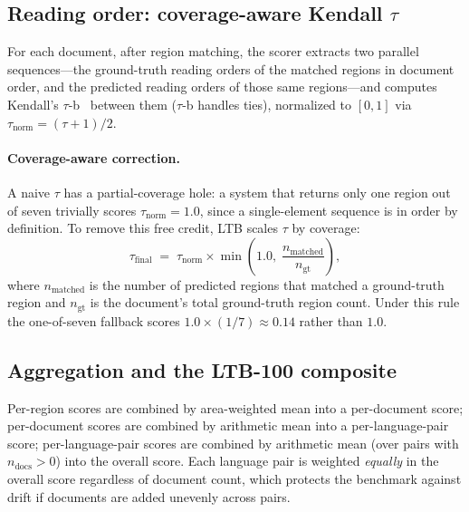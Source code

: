 \documentclass[11pt]{article}
\begin{document}
\subsection{Reading order: coverage-aware Kendall $\tau$}

For each document, after region matching, the scorer extracts two parallel
sequences---the ground-truth reading orders of the matched regions in document
order, and the predicted reading orders of those same regions---and computes
Kendall's $\tau$-b~\citep{kendall1938tau} between them ($\tau$-b handles ties),
normalized to $[0,1]$ via $\tau_{\mathrm{norm}} = (\tau + 1)/2$.

\paragraph{Coverage-aware correction.} A naive $\tau$ has a partial-coverage
hole: a system that returns only one region out of seven trivially scores
$\tau_{\mathrm{norm}}=1.0$, since a single-element sequence is in order by
definition. To remove this free credit, LTB scales $\tau$ by coverage:
\begin{equation}
\tau_{\mathrm{final}} \;=\; \tau_{\mathrm{norm}} \times
\min\!\left(1.0,\; \frac{n_{\mathrm{matched}}}{n_{\mathrm{gt}}}\right),
\end{equation}
where $n_{\mathrm{matched}}$ is the number of predicted regions that matched a
ground-truth region and $n_{\mathrm{gt}}$ is the document's total ground-truth
region count. Under this rule the one-of-seven fallback scores
$1.0 \times (1/7) \approx 0.14$ rather than $1.0$.

\subsection{Aggregation and the LTB-100 composite}

Per-region scores are combined by area-weighted mean into a per-document score;
per-document scores are combined by arithmetic mean into a per-language-pair
score; per-language-pair scores are combined by arithmetic mean (over pairs with
$n_{\mathrm{docs}} > 0$) into the overall score. Each language pair is weighted
\emph{equally} in the overall score regardless of document count, which protects
the benchmark against drift if documents are added unevenly across pairs.
\end{document}
